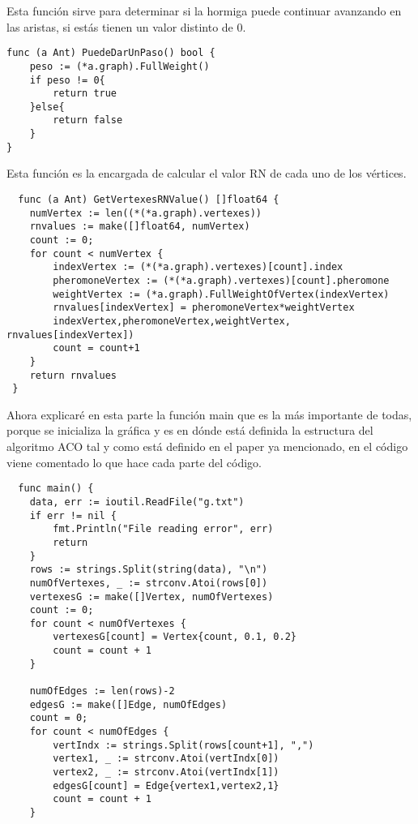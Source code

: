 \documentclass[a4paper, 11pt, spanish, oneside]{book}
\begin{document}
\begin{itemize}
 Esta función sirve para determinar si la hormiga puede continuar avanzando en las aristas, si estás tienen un valor distinto de 0.
 \begin{verbatim}
func (a Ant) PuedeDarUnPaso() bool {
    peso := (*a.graph).FullWeight()
    if peso != 0{
        return true
    }else{
        return false
    }
}
 \end{verbatim}
 Esta función es la encargada de calcular el valor RN de cada uno de los vértices.
 \begin{center}
 \begin{verbatim}
  func (a Ant) GetVertexesRNValue() []float64 {
    numVertex := len((*(*a.graph).vertexes))
    rnvalues := make([]float64, numVertex)
    count := 0;
    for count < numVertex {
        indexVertex := (*(*a.graph).vertexes)[count].index
        pheromoneVertex := (*(*a.graph).vertexes)[count].pheromone
        weightVertex := (*a.graph).FullWeightOfVertex(indexVertex)
        rnvalues[indexVertex] = pheromoneVertex*weightVertex
        indexVertex,pheromoneVertex,weightVertex, rnvalues[indexVertex])
        count = count+1
    }
    return rnvalues
 }
 \end{verbatim}
 \end{center}
 
 Ahora explicaré en esta parte la función main que es la más importante de todas, porque se inicializa la gráfica y es en dónde está definida la estructura del algoritmo ACO tal y como está definido en el paper ya mencionado, en el código viene comentado lo que hace cada parte del código.
 
 \begin{verbatim}
  func main() {
    data, err := ioutil.ReadFile("g.txt")
    if err != nil {
        fmt.Println("File reading error", err)
        return
    }
    rows := strings.Split(string(data), "\n")
    numOfVertexes, _ := strconv.Atoi(rows[0])
    vertexesG := make([]Vertex, numOfVertexes)
    count := 0;
    for count < numOfVertexes {
        vertexesG[count] = Vertex{count, 0.1, 0.2}
        count = count + 1
    }

    numOfEdges := len(rows)-2
    edgesG := make([]Edge, numOfEdges)
    count = 0;
    for count < numOfEdges {
        vertIndx := strings.Split(rows[count+1], ",")  
        vertex1, _ := strconv.Atoi(vertIndx[0])
        vertex2, _ := strconv.Atoi(vertIndx[1])
        edgesG[count] = Edge{vertex1,vertex2,1}
        count = count + 1
    }
 \end{verbatim}
\end{itemize}
\end{document}
